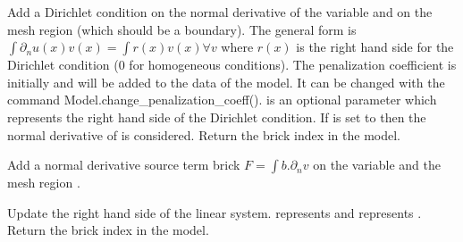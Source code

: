 \documentclass[a4paper,11pt,english]{sphinxmanual}
\begin{document}
\begin{fulllineitems}
\begin{fulllineitems}
\label{\detokenize{python/cmdref_Model:getfem.Model.add_normal_derivative_Dirichlet_condition_with_penalization}}
Add a Dirichlet condition on the normal derivative of the variable
 and on the mesh region  (which should be a boundary).
The general form is
\(\int \partial_n u(x)v(x) = \int r(x)v(x) \forall v\)
where \(r(x)\) is
the right hand side for the Dirichlet condition (0 for
homogeneous conditions).
The penalization coefficient
is initially  and will be added to the data of the model.
It can be changed with the command Model.change\_penalization\_coeff().
 is an optional parameter which represents
the right hand side of the Dirichlet condition.
If  is set to  then the normal
derivative of  is considered.
Return the brick index in the model.

\end{fulllineitems}


\begin{fulllineitems}
\label{\detokenize{python/cmdref_Model:getfem.Model.add_normal_derivative_source_term_brick}}
Add a normal derivative source term brick
\(F = \int b.\partial_n v\) on the variable  and the
mesh region .

Update the right hand side of the linear system.
 represents  and  represents .
Return the brick index in the model.

\end{fulllineitems}


\end{fulllineitems}
\end{document}
